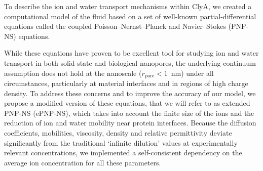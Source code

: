 \documentclass[journal=ancac3,manuscript=article,etalmode=truncate,maxauthors=0,layout=twocolumn]{achemso}
\begin{document}

To describe the ion and water transport mechanisms within ClyA, we created a computational model of the fluid
based on a set of well-known partial-differential equations called the coupled
Poisson--Nernst--Planck and Navier--Stokes (PNP-NS) equations.

While these equations have proven to be excellent tool for studying ion and water transport in both
solid-state\cite{Daiguji-2004,Lu-2012,Chaudhry-2014,Rempfer-2016,Lin-2016} and biological
nanopores\cite{Eisenberg-1996,Simakov-2010,Pederson-2015}, the underlying continuum assumption does not hold
at the nanoscale ($r_{\text{pore}}<1$~nm) under all circumstances, particularly at material
interfaces\cite{Vo-2016} and in regions of high charge density\cite{Corry-2000}. To address these concerns
and to improve the accuracy of our model, we propose a modified version of these equations, that we will
refer to as extended PNP-NS (ePNP-NS), which takes into account the finite size of the
ions\cite{Borukhov-1997,Lu-2011} and the reduction of ion and water mobility near protein
interfaces.\cite{Makarov-1998, Pronk-2014} Because the diffusion coefficients\cite{Mills-1989},
mobilities\cite{Baldessari-2008-2}, viscosity\cite{Hai-Lang-1996}, density\cite{Hai-Lang-1996} and relative
permittivity\cite{Gavish-2016} deviate significantly from the traditional `infinite dilution' values at
experimentally relevant concentrations, we implemented a self-consistent dependency on the average ion
concentration for all these parameters.
\end{document}

